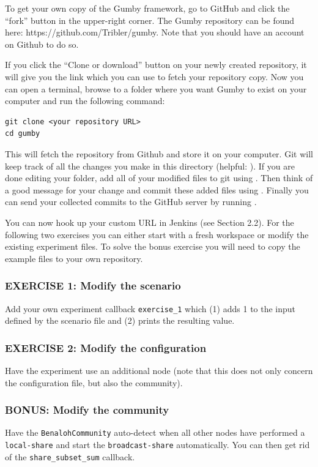 \documentclass{article}
\begin{document}
\noindent To get your own copy of the Gumby framework, go to GitHub and click the ``fork'' button in the upper-right corner.
The Gumby repository can be found here: https://github.com/Tribler/gumby.
Note that you should have an account on Github to do so.

If you click the ``Clone or download'' button on your newly created repository, it will give you the link which you can use to fetch your repository copy.
Now you can open a terminal, browse to a folder where you want Gumby to exist on your computer and run the following command:

\begin{lstlisting}[frame=single]
git clone <your repository URL>
cd gumby
\end{lstlisting}

This will fetch the repository from Github and store it on your computer.
Git will keep track of all the changes you make in this directory (helpful: ).
If you are done editing your folder, add all of your modified files to git using .
Then think of a good message for your change and commit these added files using .
Finally you can send your collected commits to the GitHub server by running .

You can now hook up your custom URL in Jenkins (see Section 2.2).
For the following two exercises you can either start with a fresh workspace or modify the existing experiment files.
To solve the bonus exercise you will need to copy the example files to your own repository.

\subsubsection{EXERCISE 1: Modify the scenario}
Add your own experiment callback \texttt{exercise\_1} which (1) adds 1 to the input defined by the scenario file and (2) prints the resulting value.

\subsubsection{EXERCISE 2: Modify the configuration}
Have the experiment use an additional node (note that this does not only concern the configuration file, but also the community).

\subsubsection{BONUS: Modify the community}
Have the \texttt{BenalohCommunity} auto-detect when all other nodes have performed a \texttt{local-share} and start the \texttt{broadcast-share} automatically.
You can then get rid of the \texttt{share\_subset\_sum} callback.


{\small }
\end{document}
